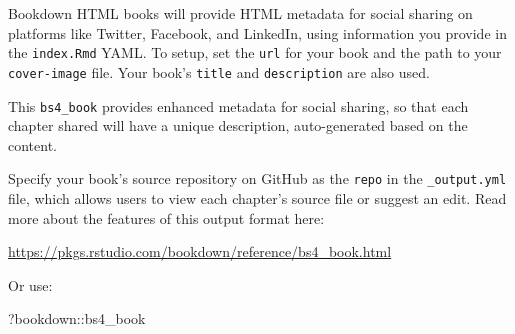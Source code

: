 \documentclass[
]{book}
\newenvironment{Shaded}{\begin{snugshade}}{\end{snugshade}}
\newcommand{\NormalTok}[1]{#1}
\newcommand{\SpecialCharTok}[1]{\textcolor[rgb]{0.00,0.00,0.00}{#1}}
\theoremstyle{definition}
\theoremstyle{definition}
\theoremstyle{definition}
\theoremstyle{definition}
\theoremstyle{remark}
\begin{document}
Bookdown HTML books will provide HTML metadata for social sharing on platforms like Twitter, Facebook, and LinkedIn, using information you provide in the \texttt{index.Rmd} YAML. To setup, set the \texttt{url} for your book and the path to your \texttt{cover-image} file. Your book's \texttt{title} and \texttt{description} are also used.

This \texttt{bs4\_book} provides enhanced metadata for social sharing, so that each chapter shared will have a unique description, auto-generated based on the content.

Specify your book's source repository on GitHub as the \texttt{repo} in the \texttt{\_output.yml} file, which allows users to view each chapter's source file or suggest an edit. Read more about the features of this output format here:

\url{https://pkgs.rstudio.com/bookdown/reference/bs4_book.html}

Or use:

\begin{Shaded}
\begin{Highlighting}[]
\NormalTok{?bookdown}\SpecialCharTok{::}\NormalTok{bs4\_book}
\end{Highlighting}
\end{Shaded}


  
\end{document}

